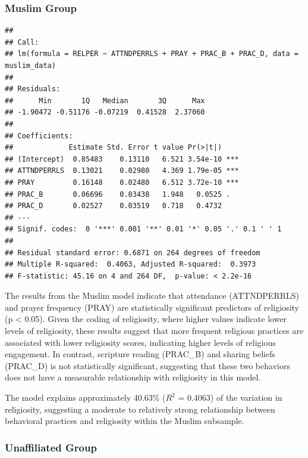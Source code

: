 \documentclass[
]{article}
\begin{document}
\subsubsection{Muslim Group}\label{muslim-group}

\begin{verbatim}
## 
## Call:
## lm(formula = RELPER ~ ATTNDPERRLS + PRAY + PRAC_B + PRAC_D, data = muslim_data)
## 
## Residuals:
##      Min       1Q   Median       3Q      Max 
## -1.90472 -0.51176 -0.07219  0.41528  2.37060 
## 
## Coefficients:
##             Estimate Std. Error t value Pr(>|t|)    
## (Intercept)  0.85483    0.13110   6.521 3.54e-10 ***
## ATTNDPERRLS  0.13021    0.02980   4.369 1.79e-05 ***
## PRAY         0.16148    0.02480   6.512 3.72e-10 ***
## PRAC_B       0.06696    0.03438   1.948   0.0525 .  
## PRAC_D       0.02527    0.03519   0.718   0.4732    
## ---
## Signif. codes:  0 '***' 0.001 '**' 0.01 '*' 0.05 '.' 0.1 ' ' 1
## 
## Residual standard error: 0.6871 on 264 degrees of freedom
## Multiple R-squared:  0.4063, Adjusted R-squared:  0.3973 
## F-statistic: 45.16 on 4 and 264 DF,  p-value: < 2.2e-16
\end{verbatim}

The results from the Muslim model indicate that attendance (ATTNDPERRLS)
and prayer frequency (PRAY) are statistically significant predictors of
religiosity (p \textless{} 0.05). Given the coding of religiosity, where
higher values indicate lower levels of religiosity, these results
suggest that more frequent religious practices are associated with lower
religiosity scores, indicating higher levels of religious engagement. In
contrast, scripture reading (PRAC\_B) and sharing beliefs (PRAC\_D) is
not statistically significant, suggesting that these two behaviors does
not have a measurable relationship with religiosity in this model.

The model explains approximately 40.63\% (\(R^2\) = 0.4063) of the
variation in religiosity, suggesting a moderate to relatively strong
relationship between behavioral practices and religiosity within the
Muslim subsample.

\subsubsection{Unaffiliated Group}\label{unaffiliated-group}
\end{document}
